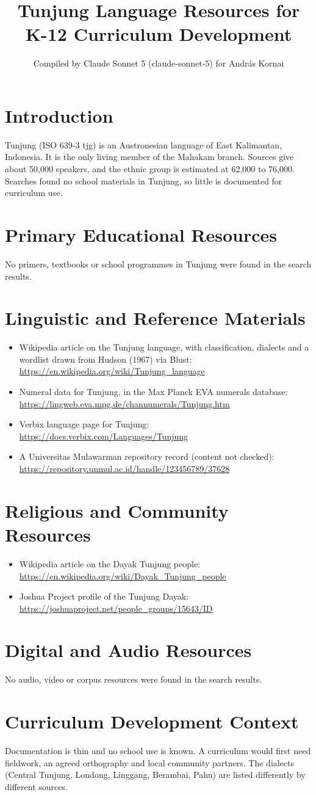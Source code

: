 \documentclass[12pt]{article}
\title{Tunjung Language Resources for K-12 Curriculum Development}
\author{Compiled by Claude Sonnet 5 (claude-sonnet-5) for Andr\'as Kornai}
\date{}
\begin{document}
\maketitle
\section{Introduction}
Tunjung (ISO 639-3 tjg) is an Austronesian language of East Kalimantan, Indonesia. It is the only living member of the Mahakam branch. Sources give about 50,000 speakers, and the ethnic group is estimated at 62,000 to 76,000. Searches found no school materials in Tunjung, so little is documented for curriculum use.
\section{Primary Educational Resources}
No primers, textbooks or school programmes in Tunjung were found in the search results.
\section{Linguistic and Reference Materials}
\begin{itemize}
\item Wikipedia article on the Tunjung language, with classification, dialects and a wordlist drawn from Hudson (1967) via Blust: \url{https://en.wikipedia.org/wiki/Tunjung_language}
\item Numeral data for Tunjung, in the Max Planck EVA numerals database: \url{https://lingweb.eva.mpg.de/channumerals/Tunjung.htm}
\item Verbix language page for Tunjung: \url{https://docs.verbix.com/Languages/Tunjung}
\item A Universitas Mulawarman repository record (content not checked): \url{https://repository.unmul.ac.id/handle/123456789/37628}
\end{itemize}
\section{Religious and Community Resources}
\begin{itemize}
\item Wikipedia article on the Dayak Tunjung people: \url{https://en.wikipedia.org/wiki/Dayak_Tunjung_people}
\item Joshua Project profile of the Tunjung Dayak: \url{https://joshuaproject.net/people_groups/15643/ID}
\end{itemize}
\section{Digital and Audio Resources}
No audio, video or corpus resources were found in the search results.
\section{Curriculum Development Context}
Documentation is thin and no school use is known. A curriculum would first need fieldwork, an agreed orthography and local community partners. The dialects (Central Tunjung, Londong, Linggang, Berambai, Pahu) are listed differently by different sources.
\end{document}
